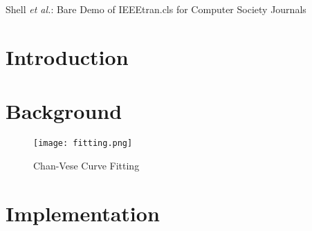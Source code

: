 \documentclass[12pt,journal,letterpaper,compsoc]{IEEEtran}
\begin{document}
\title{}

\author{Karim Ali\\
\{karim\}@cs.uwaterloo.ca \\
David R. Cheriton School of Computer Science\\
University of Waterloo\\
}

%
{Shell \MakeLowercase{\textit{et al.}}: Bare Demo of IEEEtran.cls for Computer Society Journals}


\maketitle

% 
% 
% 

\section{Introduction}
\label{sec:intro}

\section{Background}
\label{sec:bg}

\begin{figure}[t!]
\centering
\texttt{[image: fitting.png]}
\caption{Chan-Vese Curve Fitting}
\label{fig:fitting}
\end{figure}

\section{Implementation}
\label{sec:implementation}
\end{document}
